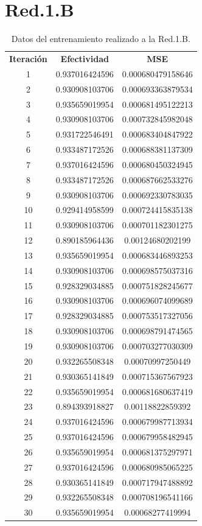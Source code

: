 \documentclass{iccmemoria}
\begin{document}
\section{Red.1.B}

\begin{longtable}{ccc} 
\caption{Datos del entrenamiento realizado a la Red.1.B.}\label{tab:training Red.1.B}\\

	\addlinespace
	\toprule
	\multicolumn{3}{c}{{\bf Entrenamiento Red.1.B}} \\
	\midrule
	{\bf Iteración} & {\bf Efectividad} & {\bf MSE} \\
	1 & 0.937016424596 & 0.000680479158646 \\
	2 & 0.930908103706 & 0.000693363879534 \\
	3 & 0.935659019954 & 0.000681495122213 \\
	4 & 0.930908103706 & 0.000732845982048 \\
	5 & 0.931722546491 & 0.000683404847922 \\
	6 & 0.933487172526 & 0.000688381137309 \\
	7 & 0.937016424596 & 0.000680450324945 \\
	8 & 0.933487172526 & 0.000687662533276 \\
	9 & 0.930908103706 & 0.000692330783035 \\
	10 & 0.929414958599 & 0.000724415835138 \\
	11 & 0.930908103706 & 0.000701182301275 \\
	12 & 0.890185964436 & 0.00124680202199 \\
	13 & 0.935659019954 & 0.000683446893253 \\
	14 & 0.930908103706 & 0.000698575037316 \\
	15 & 0.928329034885 & 0.000751828245677 \\
	16 & 0.930908103706 & 0.000696074099689 \\
	17 & 0.928329034885 & 0.000753517327056 \\
	18 & 0.930908103706 & 0.000698791474565 \\
	19 & 0.930908103706 & 0.000703277030309 \\
	20 & 0.932265508348 & 0.00070997250449 \\
	21 & 0.930365141849 & 0.000715367567923 \\
	22 & 0.935659019954 & 0.000681680637419 \\
	23 & 0.894393918827 & 0.00118822859392 \\
	24 & 0.937016424596 & 0.000679987713934 \\
	25 & 0.937016424596 & 0.000679958482945 \\
	26 & 0.935659019954 & 0.000681375297971 \\
	27 & 0.937016424596 & 0.000680985065225 \\
	28 & 0.930365141849 & 0.000717947488892 \\
	29 & 0.932265508348 & 0.000708196541166 \\
	30 & 0.935659019954 & 0.00068277419994 \\
	\bottomrule

\end{longtable}
\end{document}
